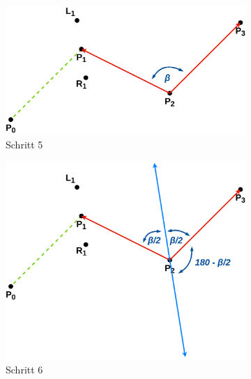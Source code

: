 \documentclass[doktyp=studarbeit]{TUBAFarbeiten}
\begin{document}
\begin{figure}[!htb]
\begin{subfigure}[b]{0.45\textwidth}
        \centering
        \includegraphics[width=1\linewidth]{Schlangenlinie-5.png}
        \caption{Schritt 5}
    \end{subfigure}
    \qquad
    \begin{subfigure}[b]{0.45\textwidth}
        \centering
        \includegraphics[width=1\linewidth]{Schlangenlinie-6.png}
        \caption{Schritt 6}
    \end{subfigure}
    \qquad
    \begin{subfigure}[b]{0.45\textwidth}
        \centering

\end{subfigure}
\end{figure}
\end{document}

